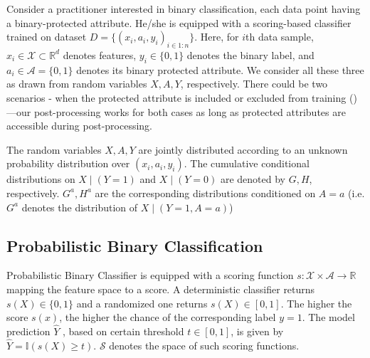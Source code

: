 \documentclass{article}
\begin{document}
Consider a practitioner interested in binary classification, each data point having a binary-protected attribute. He/she is equipped with a scoring-based classifier trained on dataset $D=\{(x_i,a_i,y_i)_{i\in 1:n}\}$. Here, for $i$th data sample, $x_i \in \mathcal{X}\subset \mathbb{R}^d$ denotes features, $y_i\in\{0,1\}$ denotes the binary label, and $a_i\in\mathcal{A}=\{0,1\}$ denotes its binary protected attribute. We consider all these three as drawn from random variables $X, A, Y$, respectively.
There could be two scenarios - when the protected attribute is included or excluded from training (\cite{wei20})—our post-processing works for both cases as long as protected attributes are accessible during post-processing.

The random variables $X, A, Y$ are jointly distributed according to an unknown probability distribution over $(x_i, a_i, y_i)$. The cumulative conditional distributions on ${X\mid( Y=1)}$  and $X\mid (Y=0)$ are denoted by $G, H$, respectively. $ G^a, H^a$ are the corresponding distributions conditioned on $A=a$ (i.e. $G^a$ denotes the distribution of $X\mid (Y =1 , A = a)$) 

\subsection{Probabilistic Binary Classification}

Probabilistic Binary Classifier is equipped with a scoring function $s:\mathcal{X} \times \mathcal{A} \rightarrow \mathbb{R}$ mapping the feature space to a score.  
A deterministic classifier returns $s(X) \in \{0,1\}$ and a randomized one returns $s(X) \in [0, 1]$.
The higher the score $s(x)$, the higher the chance of the corresponding label $y = 1$.
The model prediction $\widehat{Y}$ , based on certain threshold $t\in [0,1]$, is given by $\widehat{Y} = \mathbb{I}(s(X) \geq t)$. $\mathcal{S}$ denotes the space of such scoring functions. 
\end{document}
